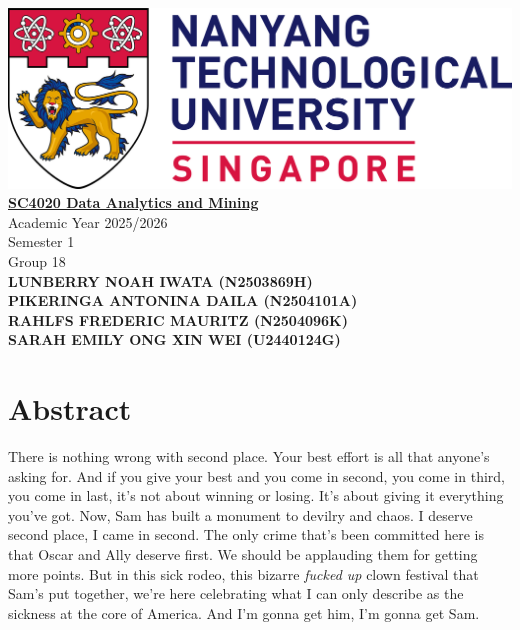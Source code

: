 \documentclass[12pt]{article}
\begin{document}
\begin{center}
    \includegraphics[width=\linewidth]{NTU_Logo.png}
    \\[1cm]
    \underline{\textbf{SC4020 Data Analytics and Mining}}
    \\[1.5em]
    Academic Year 2025/2026
    \\[1em]
    Semester 1
    \\[2em]
    Group 18
    \\[5em]
    \textbf{
        LUNBERRY NOAH IWATA (N2503869H) \\[1em]
        PIKERINGA ANTONINA DAILA (N2504101A) \\[1em]
        RAHLFS FREDERIC MAURITZ (N2504096K) \\[1em]
        SARAH EMILY ONG XIN WEI (U2440124G) \\[1em]
        }
\end{center}
\pagebreak

\justifying

\pagestyle{fancy}
\fancyhf{}  %
\fancyhead[R]{\textcolor{gray}{\nouppercase{\leftmark}}}   %
\fancyfoot[C]{\thepage}  %


\section*{Abstract}

There is nothing wrong with second place.
Your best effort is all that anyone's asking for.
And if you give your best and you come in second, you come in third, you come in last, it's not about winning or losing.
It's about giving it everything you've got.
Now, Sam has built a monument to devilry and chaos.
I deserve second place, I came in second.
The only crime that's been committed here is that Oscar and Ally deserve first.
We should be applauding them for getting more points.
But in this sick rodeo, this bizarre \textit{fucked up} clown festival that Sam's put together, we're here celebrating what I can only describe as the sickness at the core of America.
And I'm gonna get him, I'm gonna get Sam.
\end{document}
